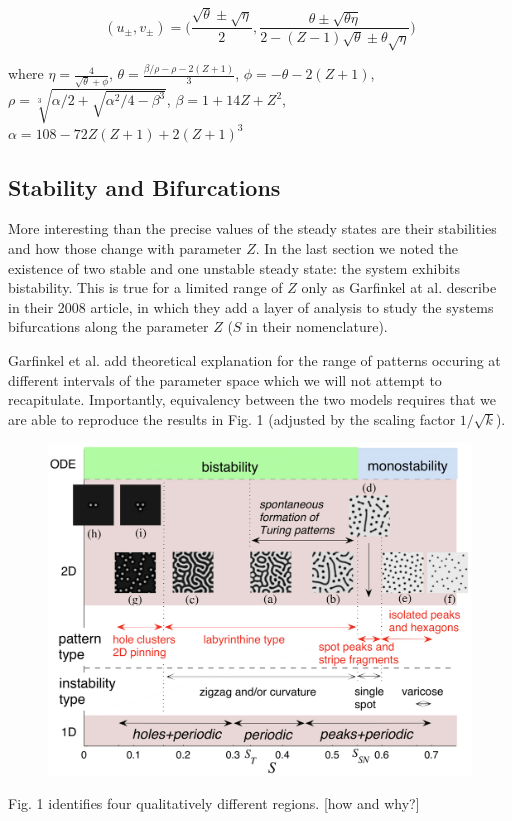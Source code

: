 \documentclass{article}
\begin{document}
$$(u_\pm,v_\pm)=\Bigg(\frac{\sqrt{\theta}\pm\sqrt{\eta}}{2}, \frac{\theta\pm\sqrt{\theta\eta}}{2-(Z-1)\sqrt{\theta}\pm\theta\sqrt{\eta}}\Bigg)$$

where $\eta = \frac{4}{\sqrt{\theta}+\phi}$, $\theta=\frac{\beta/\rho-\rho-2(Z+1)}{3}$, $\phi = -\theta-2(Z+1)$, $\rho = \sqrt[3]{\alpha/2+\sqrt{\alpha^2/4-\beta^3}}$, $\beta = 1+14Z+Z^2$, $\alpha = 108-72Z(Z+1)+2(Z+1)^3$

\subsection{Stability and Bifurcations}

More interesting than the precise values of the steady states are their stabilities and how those change with parameter $Z$. In the last section we noted the existence of two stable and one unstable steady state: the system exhibits bistability. This is true for a limited range of $Z$ only as Garfinkel at al. describe in their 2008 article, in which they add a layer of analysis to study the systems bifurcations along the parameter $Z$ ($S$ in their nomenclature).

Garfinkel et al. add theoretical explanation for the range of patterns occuring at different intervals of the parameter space which we will not attempt to recapitulate. Importantly, equivalency between the two models requires that we are able to reproduce the results in Fig. 1 (adjusted by the scaling factor $1/\sqrt{k}$).


\begin{figure}[H]
\centering
  \includegraphics[width=0.7 \linewidth]{parameter_space.png}
  \caption{}
  \label{fig:s}
\end{figure}

Fig. 1 identifies four qualitatively different regions. [how and why?]
\end{document}
